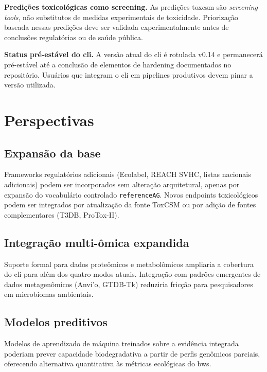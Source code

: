 \textbf{Predições toxicológicas como screening.} As predições \gls{toxcsm} são \textit{screening tools}, não substitutos de medidas experimentais de toxicidade. Priorização baseada nessas predições deve ser validada experimentalmente antes de conclusões regulatórias ou de saúde pública.

\textbf{Status pré-estável do \gls{cli}.} A versão atual do \gls{cli} é rotulada v0.14 e permanecerá pré-estável até a conclusão de elementos de hardening documentados no repositório. Usuários que integram o \gls{cli} em pipelines produtivos devem pinar a versão utilizada.

\section{Perspectivas}
\label{sec:c7-perspectivas}

\subsection{Expansão da base}

Frameworks regulatórios adicionais (Ecolabel, REACH SVHC, listas nacionais adicionais) podem ser incorporados sem alteração arquitetural, apenas por expansão do vocabulário controlado \texttt{referenceAG}. Novos endpoints toxicológicos podem ser integrados por atualização da fonte ToxCSM ou por adição de fontes complementares (T3DB, ProTox-II).

\subsection{Integração multi-ômica expandida}

Suporte formal para dados proteômicos e metabolômicos ampliaria a cobertura do \gls{cli} para além dos quatro modos atuais. Integração com padrões emergentes de dados metagenômicos (Anvi'o, GTDB-Tk) reduziria fricção para pesquisadores em microbiomas ambientais.

\subsection{Modelos preditivos}

Modelos de aprendizado de máquina treinados sobre a evidência integrada poderiam prever capacidade biodegradativa a partir de perfis genômicos parciais, oferecendo alternativa quantitativa às métricas ecológicas do \gls{bws}.

